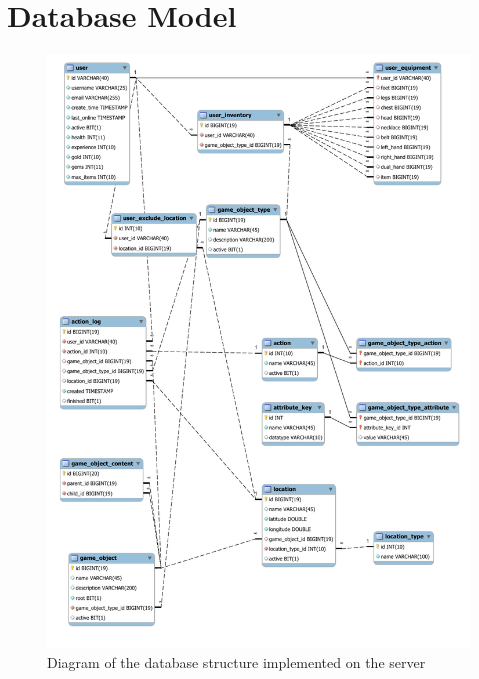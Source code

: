 \section{Database Model}
\begin{figure}[h]	
	\includegraphics[width=\textwidth]{figures/DatabaseModel}
	\centering
	\caption{Diagram of the database structure implemented on the server}
	\label{fig:dbmodel}	
\end{figure}
%
%	
%	
%	
%	

